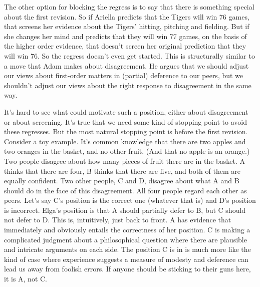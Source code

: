 The other option for blocking the regress is to say that there is something special about the first revision. So if \gls{Ariella} predicts that the Tigers will win 76 games, that screens her evidence about the Tigers' hitting, pitching and fielding. But if she changes her mind and predicts that they will win 77 games, on the basis of the higher order evidence, that doesn't screen her original prediction that they will win 76. So the regress doesn't even get started. This is structurally similar to a move that Adam \citet{Elga2010} makes about disagreement. He argues that we should adjust our views about first-order matters in (partial) deference to our peers, but we shouldn't adjust our views about the right response to disagreement in the same way.

It's hard to see what could motivate such a position, either about disagreement or about screening. It's true that we need some kind of stopping point to avoid these regresses. But the most natural stopping point is before the first revision. Consider a toy example. It's common knowledge that there are two apples and two oranges in the basket, and no other fruit. (And that no apple is an orange.) Two people disagree about how many pieces of fruit there are in the basket. A thinks that there are four, B thinks that there are five, and both of them are equally confident. Two other people, C and D, disagree about what A and B should do in the face of this disagreement. All four people regard each other as peers. Let's say C's position is the correct one (whatever that is) and D's position is incorrect. Elga's position is that A should partially defer to B, but C should not defer to D. This is, intuitively, just back to front. A has evidence that immediately and obviously entails the correctness of her position. C is making a complicated judgment about a philosophical question where there are plausible and intricate arguments on each side. The position C is in is much more like the kind of case where experience suggests a measure of modesty and deference can lead us away from foolish errors. If anyone should be sticking to their guns here, it is A, not C.


